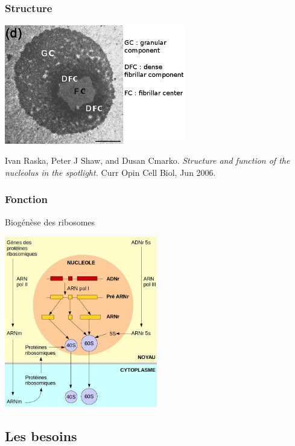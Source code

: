 \documentclass{beamer}
\begin{document}
\begin{frame}
  \frametitle{Structure}
  
  \begin{block}{}

    \begin{center}
      \includegraphics[width=0.6\textwidth]{img/microNuc.png}
    \end{center}

    
    Ivan Raska, Peter J Shaw, and Dusan Cmarko. \textit{Structure and function of the nucleolus in the spotlight.} Curr Opin Cell Biol, Jun 2006.
  \end{block}

\end{frame}

\begin{frame}
  \frametitle{Fonction}
  
  \begin{block}{Biogénèse des ribosomes}
  \begin{center}
    \includegraphics[width=0.5\textwidth]{img/biogenese.png}
  \end{center}
  \end{block}

\end{frame}

\subsection{Les besoins}
\end{document}
